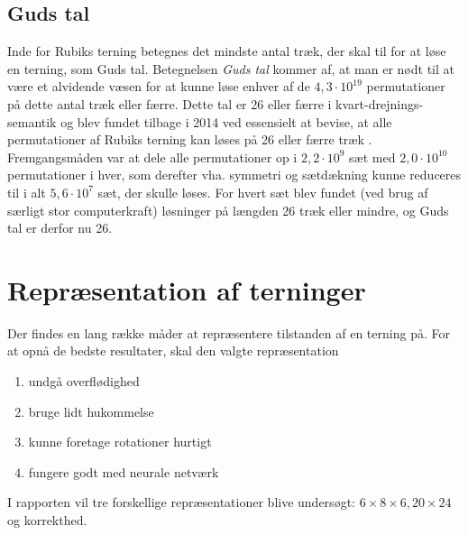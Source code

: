 \documentclass[../main.tex]{subfiles}
\begin{document}
\subsection*{Guds tal}
Inde for Rubiks terning betegnes det mindste antal træk, der skal til for at løse en terning, som Guds tal.
Betegnelsen \emph{Guds tal} kommer af, at man er nødt til at være et alvidende væsen for at kunne løse enhver af de $4,3\cdot10^{19}$ permutationer på dette antal træk eller færre.
Dette tal er 26 eller færre i kvart-drejnings-semantik og blev fundet tilbage i 2014 ved essensielt at bevise, at alle permutationer af Rubiks terning kan løses på 26 eller færre træk \cite{10.4169/college.math.j.45.4.242}.
Fremgangsmåden var at dele alle permutationer op i $2,2\cdot10^9$ sæt med $2,0\cdot10^{10}$ permutationer i hver, som derefter vha. symmetri og sætdækning kunne reduceres til i alt $5,6\cdot10^7$ sæt, der skulle løses.
For hvert sæt blev fundet (ved brug af særligt stor computerkraft) løsninger på længden 26 træk eller mindre, og Guds tal er derfor nu 26. 



\section{Repræsentation af terninger}\label{sec:repr}
Der findes en lang række måder at repræsentere tilstanden af en terning på.
For at opnå de bedste resultater, skal den valgte repræsentation
\begin{enumerate}
	\item undgå overflødighed
	\item bruge lidt hukommelse
	\item kunne foretage rotationer hurtigt
	\item fungere godt med neurale netværk
\end{enumerate}
I rapporten vil tre forskellige repræsentationer blive undersøgt: $ 6\times 8\times 6, 20\times 24 $ og korrekthed.
\end{document}
